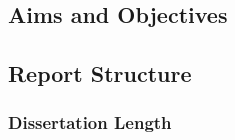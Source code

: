 \subsection{Aims and Objectives} 

\subsection{Report Structure}

\subsubsection{Dissertation Length}






	
	
	
	


